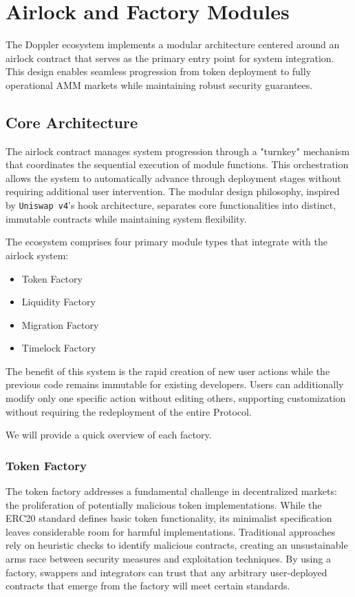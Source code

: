 \documentclass[sigconf,nonacm,prologue,table]{acmart}
\numberwithin{equation}{section}
\theoremstyle{definition}
\theoremstyle{remark}
\begin{document}
\section{Airlock and Factory Modules}
The Doppler ecosystem implements a modular architecture centered around an airlock contract that serves as the primary entry point for system integration. This design enables seamless progression from token deployment to fully operational AMM markets while maintaining robust security guarantees.

\subsection{Core Architecture}
The airlock contract manages system progression through a "turnkey" mechanism that coordinates the sequential execution of module functions. This orchestration allows the system to automatically advance through deployment stages without requiring additional user intervention. The modular design philosophy, inspired by \verb|Uniswap v4|'s hook architecture, separates core functionalities into distinct, immutable contracts while maintaining system flexibility.

The ecosystem comprises four primary module types that integrate with the airlock system:

\begin{itemize}
    \item Token Factory
    \item Liquidity Factory
    \item Migration Factory
    \item Timelock Factory
\end{itemize}

The benefit of this system is the rapid creation of new user actions while the previous code remains immutable for existing developers. Users can additionally modify only one specific action without editing others, supporting customization without requiring the redeployment of the entire Protocol. 

We will provide a quick overview of each factory.

\subsubsection{Token Factory}

The token factory addresses a fundamental challenge in decentralized markets: the proliferation of potentially malicious token implementations. While the ERC20 standard defines basic token functionality, its minimalist specification leaves considerable room for harmful implementations. Traditional approaches rely on heuristic checks to identify malicious contracts, creating an unsustainable arms race between security measures and exploitation techniques. By using a factory, swappers and integrators can trust that any arbitrary user-deployed contracts that emerge from the factory will meet certain standards. 
\end{document}
